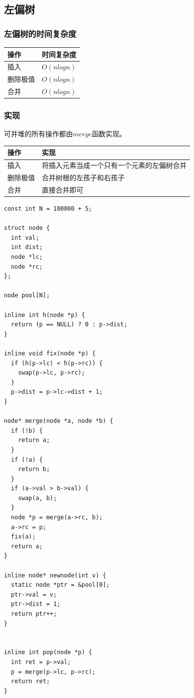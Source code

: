 \documentclass[11pt]{article}
\begin{document}
\subsection{左偏树}
\label{sec:org8913a35}
\subsubsection{左偏树的时间复杂度}
\label{sec:org06f15e4}

\begin{center}
\begin{tabular}{ll}
操作 & 时间复杂度\\
\hline
插入 & \(O(nlogn)\)\\
删除极值 & \(O(nlogn)\)\\
合并 & \(O(nlogn)\)\\
\end{tabular}
\end{center}

\subsubsection{实现}
\label{sec:orgd298ef4}

可并堆的所有操作都由\(merge\)函数实现。

\begin{center}
\begin{tabular}{ll}
操作 & 实现\\
\hline
插入 & 将插入元素当成一个只有一个元素的左偏树合并\\
删除极值 & 合并树根的左孩子和右孩子\\
合并 & 直接合并即可\\
\end{tabular}
\end{center}


\begin{verbatim}
const int N = 100000 + 5;

struct node {
  int val;
  int dist;
  node *lc;
  node *rc;
};

node pool[N];

inline int h(node *p) {
  return (p == NULL) ? 0 : p->dist;
}

inline void fix(node *p) {
  if (h(p->lc) < h(p->rc)) {
    swap(p->lc, p->rc);
  }
  p->dist = p->lc->dist + 1;
}

node* merge(node *a, node *b) {
  if (!b) {
    return a;
  }
  if (!a) {
    return b;
  }
  if (a->val > b->val) {
    swap(a, b);
  }
  node *p = merge(a->rc, b);
  a->rc = p;
  fix(a);
  return a;
}

inline node* newnode(int v) {
  static node *ptr = &pool[0];
  ptr->val = v;
  ptr->dist = 1;
  return ptr++;
}


inline int pop(node *p) {
  int ret = p->val;
  p = merge(p->lc, p->rc);
  return ret;
}
\end{verbatim}
\end{document}
